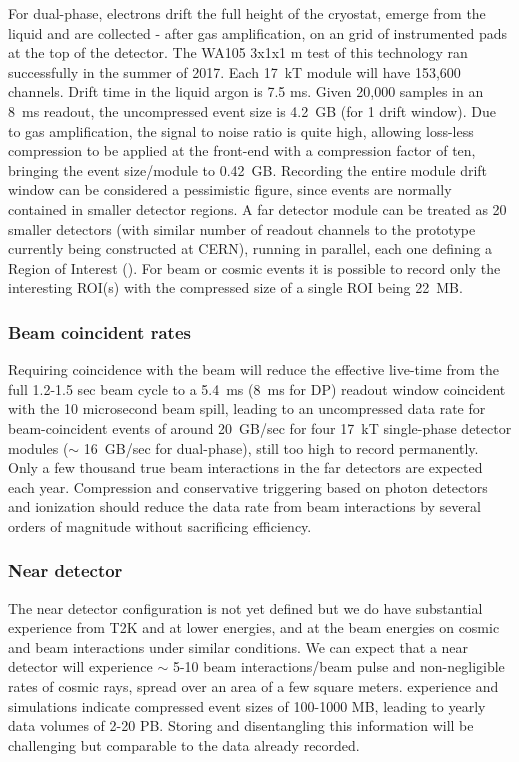 For dual-phase, electrons drift the full height of the cryostat, emerge from the liquid and are collected - after gas amplification, on an grid of instrumented pads at the top of the detector.  The WA105 3x1x1 m test of this technology ran successfully in the summer of 2017\cite{Murphy:20170516}. 
Each 17~kT module will have 153,600 channels. Drift time in the liquid argon is 7.5 ms. Given 20,000 samples in an 8~ms readout, the uncompressed event size is 4.2~GB (for 1 drift window).  Due to gas amplification, the signal to noise ratio is quite high, allowing loss-less compression to be applied at the front-end  with a compression factor of ten, bringing the event size/module to 0.42~GB. Recording the entire module drift window can be considered a pessimistic figure, since events are normally contained in smaller detector regions. A  far detector module can be treated as 20 smaller  detectors (with similar number  of readout channels to the prototype currently being constructed at CERN), running in parallel, each one defining a Region of Interest  (). For beam or cosmic events it is possible to record only the interesting ROI(s) with the compressed size of a single ROI being 22~MB.

\subsubsection{Beam coincident rates}

Requiring  coincidence with the  beam will reduce the effective live-time from the full 1.2-1.5 sec beam cycle to a 5.4~ms (8~ms for DP)  readout window coincident with the 10 microsecond beam spill, leading to an uncompressed data rate for beam-coincident events of around 20~GB/sec for four 17~kT single-phase detector modules ($\sim$ 16~GB/sec for dual-phase), still too high to record permanently.
Only a few thousand true beam interactions in the far detectors are expected each year.  Compression and conservative triggering based on photon detectors and ionization should reduce the data rate from beam interactions by several orders of magnitude without sacrificing efficiency.

\subsubsection{ Near detector} The near detector configuration is not yet defined  but we do have substantial experience from T2K and   at lower energies, and   at the   beam energies on cosmic and beam interactions under similar conditions.  We can expect that a near detector will experience $\sim$ 5-10 beam interactions/beam pulse and non-negligible rates of cosmic rays, spread over an area of a few square meters.  experience and  simulations indicate compressed event sizes of 100-1000 MB, leading to yearly data volumes of 2-20 PB.  Storing and disentangling this information will be challenging but comparable to the  data already recorded. 

